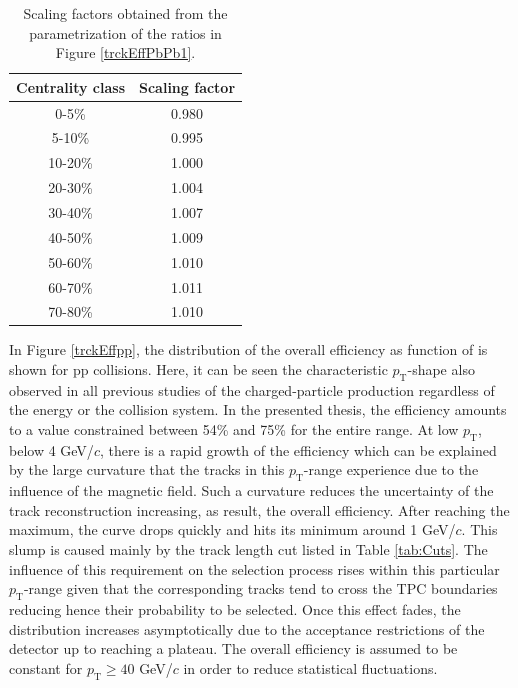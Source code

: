 \documentclass[12pt,a4paper]{report}
\begin{document}
\begin{table}[tb!]
\centering
\renewcommand{\arraystretch}{1.5}
\begin{tabular}{|c|c|}
\toprule
\rowcolor{headerBlue} \textbf{Centrality class} &  \textbf{Scaling factor}\\
\midrule
0-5\%	&	0.980	 \\
5-10\%	&	0.995	 \\
10-20\%	&	1.000	 \\
20-30\%	&	1.004	 \\
30-40\%	&	1.007	 \\
40-50\%	&	1.009	 \\
50-60\%	&	1.010	 \\
60-70\%	&	1.011	 \\
70-80\%	&	1.010	 \\
\bottomrule
\end{tabular}
\caption{Scaling factors obtained from the parametrization of the ratios in Figure \ref{trckEffPbPb1}.}
\label{tab:ScalingFactors}
\end{table} 
\hspace{-0.3cm} In Figure \ref{trckEffpp}, the distribution of the overall efficiency as function of \pt is shown for pp collisions. Here, it can be seen the characteristic $p_\text{T}$-shape also observed in all previous studies of the charged-particle production regardless of the energy or the collision system. In the presented thesis, the efficiency amounts to a value constrained between 54\% and 75\% for the entire \pt range. At low $p_\text{T}$, below 4 GeV/$c$, there is a rapid growth of the efficiency which can be explained by the large curvature that the tracks in this $p_\text{T}$-range experience due to the influence of the magnetic field. Such a curvature reduces the uncertainty of the track reconstruction increasing, as result, the overall efficiency. After reaching the maximum, the curve drops quickly and hits its minimum around 1 GeV/$c$. This slump is caused mainly by the track length cut listed in Table \ref{tab:Cuts}. The influence of this requirement on the selection process rises within this particular $p_\text{T}$-range given that the corresponding tracks tend to cross the TPC boundaries reducing hence their probability to be selected. Once this effect fades, the distribution increases asymptotically due to the acceptance restrictions of the detector up to reaching a plateau. The overall efficiency is assumed to be constant for $p_\text{T} \geq 40$ GeV/$c$ in order to reduce statistical fluctuations. \\
\end{document}
